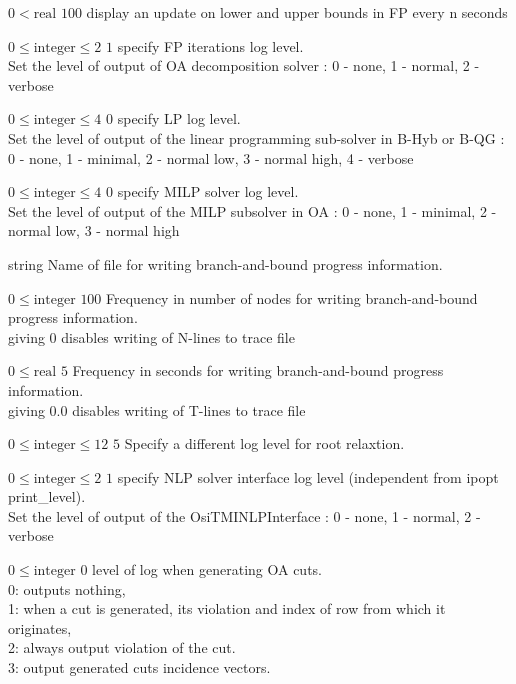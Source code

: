 %
{$0<\textrm{real}$}%
{$100$}%
{display an update on lower and upper bounds in FP every n seconds}%
{}

%
{$0\leq\textrm{integer}\leq2$}%
{$1$}%
{specify FP iterations log level.\\
Set the level of output of OA decomposition solver : 0 - none, 1 - normal, 2 - verbose}%
{}

%
{$0\leq\textrm{integer}\leq4$}%
{$0$}%
{specify LP log level.\\
Set the level of output of the linear programming sub-solver in B-Hyb or B-QG : 0 - none, 1 - minimal, 2 - normal low, 3 - normal high, 4 - verbose}%
{}

%
{$0\leq\textrm{integer}\leq4$}%
{$0$}%
{specify MILP solver log level.\\
Set the level of output of the MILP subsolver in OA : 0 - none, 1 - minimal, 2 - normal low, 3 - normal high}%
{}

%
{string}%
{}%
{Name of file for writing branch-and-bound progress information.}%
{}

%
{$0\leq\textrm{integer}$}%
{$100$}%
{Frequency in number of nodes for writing branch-and-bound progress information.\\
giving 0 disables writing of N-lines to trace file}%
{}

%
{$0\leq\textrm{real}$}%
{$5$}%
{Frequency in seconds for writing branch-and-bound progress information.\\
giving 0.0 disables writing of T-lines to trace file}%
{}

%
{$0\leq\textrm{integer}\leq12$}%
{$5$}%
{ Specify a different log level for root relaxtion.}%
{}

%
{$0\leq\textrm{integer}\leq2$}%
{$1$}%
{specify NLP solver interface log level (independent from ipopt print\_level).\\
Set the level of output of the OsiTMINLPInterface : 0 - none, 1 - normal, 2 - verbose}%
{}

%
{$0\leq\textrm{integer}$}%
{$0$}%
{level of log when generating OA cuts.\\
0: outputs nothing,\\1: when a cut is generated, its violation and index of row from which it originates,\\2: always output violation of the cut.\\3: output generated cuts incidence vectors.}%
{}


